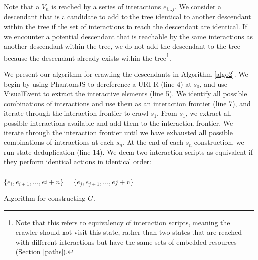 \documentclass{sig-alternate}
\begin{document}
Note that a $V_n$ is reached by a series of interactions $e_{i...j}$. We consider a descendant that is a candidate to add to the tree identical to another descendant within the tree if the set of interactions to reach the descendant are identical. If we encounter a potential descendant that is reachable by the same interactions as another descendant within the tree, we do not add the descendant to the tree because the descendant already exists within the tree\footnote{Note that this refers to equivalency of interaction scripts, meaning the crawler should not visit this state, rather than two states that are reached with different interactions but have the same sets of embedded resources (Section \ref{paths}).}.

We present our algorithm for crawling the descendants in Algorithm \ref{algo2}. We begin by using PhantomJS to dereference a URI-R (line 4) at $s_0$, and use VisualEvent to extract the interactive elements (line 5). We identify all possible combinations of interactions and use them as an interaction frontier (line 7), and iterate through the interaction frontier to crawl $s_1$. From $s_1$, we extract all possible interactions available and add them to the interaction frontier. We iterate through the interaction frontier until we have exhausted all possible combinations of interactions at each $s_n$. At the end of each $s_n$ construction, we run state deduplication (line 14). We deem two interaction scripts as equivalent if they perform identical actions in identical order:
\\ \\
\noindent$\{e_{i}, e_{i+1}, ..., e{i+n}\}$ = $\{e_{j}, e_{j+1}, ..., e{j+n}\}$

\begin{algorithm}
 \caption{Algorithm for constructing $G$.}
  \label{algo2}
\end{algorithm}
\end{document}
